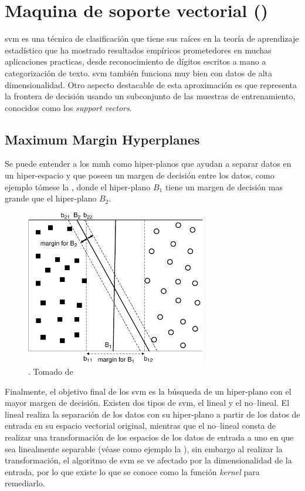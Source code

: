 
\section{Maquina de soporte vectorial ()} \label{sec:SVM}
\gls{svm} es una técnica de clasificación que tiene sus raíces en la teoría de aprendizaje estadístico que ha mostrado resultados empíricos prometedores en muchas aplicaciones practicas, desde reconocimiento de dígitos escritos a mano a categorización de texto. \gls{svm} también funciona muy bien con datos de alta dimensionalidad. Otro aspecto destacable de esta aproximación es que representa la frontera de decisión usando un subconjunto de las muestras de entrenamiento, conocidos como los \emph{support vectors}.

\subsection{Maximum Margin Hyperplanes}
Se puede entender a los \gls{mmh} como hiper-planos que ayudan a separar datos en un hiper-espacio y que poseen un margen de decisión entre los datos, como ejemplo tómese la , donde el hiper-plano $B_1$ tiene un margen de decisión mas grande que el hiper-plano $B_2$.

\begin{figure}[H]
\centering
\includegraphics[width=0.7\textwidth]{Figures/svm-hyperplanes.pdf}
\decoRule
\caption[]{. Tomado de \cite{tan2005introduction}}
\label{fig:svm-hyperplanes}
\end{figure}

Finalmente, el objetivo final de los \gls{svm} es la búsqueda de un hiper-plano con el mayor margen de decisión. Existen dos tipos de \gls{svm}, el lineal y el no--lineal. El lineal realiza la separación de los datos con su hiper-plano a partir de los datos de entrada en su espacio vectorial original, mientras que el no--lineal consta de realizar una transformación de los espacios de los datos de entrada a uno en que sea linealmente separable (véase como ejemplo la ), sin embargo al realizar la transformación, el algoritmo de \gls{svm} se ve afectado por la dimensionalidad de la entrada, por lo que existe lo que se conoce como la función \emph{kernel} para remediarlo.

